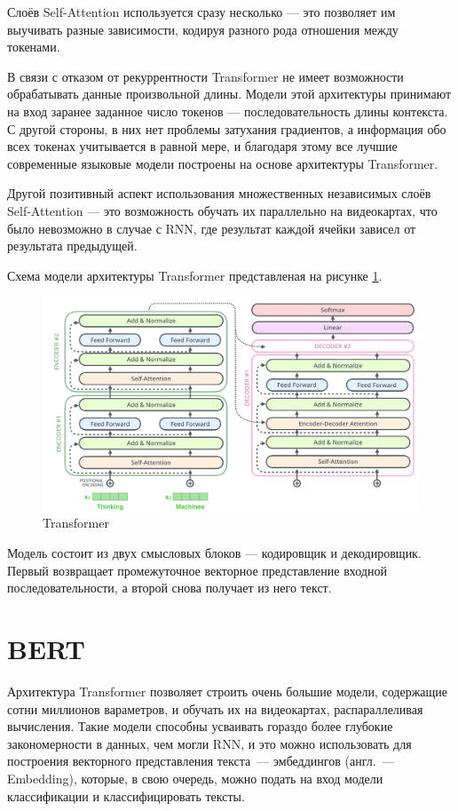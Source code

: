 Слоёв Self-Attention используется сразу несколько --- это позволяет им выучивать разные зависимости, кодируя разного рода отношения между токенами.

В связи с отказом от рекуррентности Transformer не имеет возможности обрабатывать данные произвольной длины. Модели этой архитектуры принимают на вход заранее заданное число токенов --- последовательность длины контекста. С другой стороны, в них нет проблемы затухания градиентов, а информация обо всех токенах учитывается в равной мере, и благодаря этому все лучшие современные языковые модели построены на основе архитектуры Transformer.

Другой позитивный аспект использования множественных независимых слоёв Self-Attention --- это возможность обучать их параллельно на видеокартах, что было невозможно в случае с RNN, где результат каждой ячейки зависел от результата предыдущей.

Схема модели архитектуры Transformer представленая на рисунке \ref*{fig:transformer}.

\begin{figure}[h]
    \centering
    \includegraphics[width=\textwidth]{../inc/images/transformer.png}
    \caption{Transformer}
    \label{fig:transformer}
\end{figure}

Модель состоит из двух смысловых блоков --- кодировщик и декодировщик. Первый возвращает промежуточное векторное представление входной последовательности, а второй снова получает из него текст.

\section{BERT}

Архитектура Transformer позволяет строить очень большие модели, содержащие сотни миллионов вараметров, и обучать их на видеокартах, распараллеливая вычисления. Такие модели способны усваивать гораздо более глубокие закономерности в данных, чем могли RNN, и это можно использовать для построения векторного представления текста --- эмбеддингов (англ. --- Embedding), которые, в свою очередь, можно подать на вход модели классификации и классифицировать тексты.

